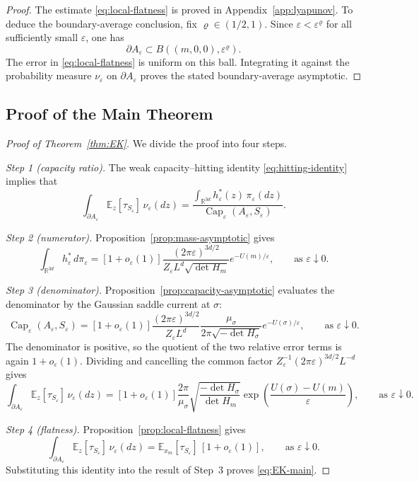 \documentclass[11pt]{article}
\numberwithin{equation}{section}
\theoremstyle{plain}
\theoremstyle{definition}
\theoremstyle{remark}
\newcommand{\R}{\mathbb R}
\newcommand{\eps}{\varepsilon}
\renewcommand{\Cap}{\operatorname{Cap}}
\newcommand{\E}{\mathbb E}
\begin{document}
\begin{proof}
The estimate \eqref{eq:local-flatness} is proved in
Appendix~\ref{app:lyapunov}.  To deduce the boundary-average conclusion, fix
$\varrho\in(1/2,1)$.  Since $\eps<\eps^\varrho$ for all sufficiently small
$\eps$, one has
\[
\partial A_\eps\subset B\left((m,0,0),\eps^\varrho\right).
\]
The error in \eqref{eq:local-flatness} is uniform on this ball.  Integrating
it against the probability measure $\nu_\eps$ on $\partial A_\eps$ proves the
stated boundary-average asymptotic.
\end{proof}

\subsection{Proof of the Main Theorem}
\label{sec:proof-main}

\begin{proof}[Proof of Theorem~\ref{thm:EK}]
We divide the proof into four steps.

\emph{Step 1 (capacity ratio).}  The weak capacity--hitting identity
\eqref{eq:hitting-identity} implies that
\[
\int_{\partial A_\eps} \E_z[\tau_{S_\eps}]\,\nu_\eps(dz)
=
\frac{\int_{\R^{3d}} h_\eps^*(z)\,\pi_\eps(dz)}{\Cap_\eps(A_\eps,S_\eps)}.
\]

\emph{Step 2 (numerator).}  Proposition~\ref{prop:mass-asymptotic} gives
\[
\int_{\R^{3d}}h_\eps^*\,d\pi_\eps
=\left[1+o_\eps(1)\right]
\frac{(2\pi\eps)^{3d/2}}{Z_\eps L^d\sqrt{\det H_m}}
e^{-U(m)/\eps},\qquad\text{as $\eps\downarrow 0$}.
\]

\emph{Step 3 (denominator).}  Proposition~\ref{prop:capacity-asymptotic}
evaluates the denominator by the Gaussian saddle current at $\sigma$:
\[
\Cap_\eps(A_\eps,S_\eps)
=\left[1+o_\eps(1)\right]
\frac{(2\pi\eps)^{3d/2}}{Z_\eps L^d}
\frac{\mu_\sigma}{2\pi\sqrt{-\det H_\sigma}}
e^{-U(\sigma)/\eps},\qquad\text{as $\eps\downarrow 0$}.
\]
The denominator is positive, so the quotient of the two relative error terms
is again $1+o_\eps(1)$.  Dividing and cancelling the common factor
$Z_\eps^{-1}(2\pi\eps)^{3d/2}L^{-d}$ gives
\[
\int_{\partial A_\eps} \E_z[\tau_{S_\eps}]\,\nu_\eps(dz)
=[1+o_\eps(1)]
\frac{2\pi}{\mu_\sigma}
\sqrt{\frac{-\det H_\sigma}{\det H_m}}
\exp\!\left(\frac{U(\sigma)-U(m)}{\eps}\right),\qquad\text{as $\eps\downarrow 0$}.
\]

\emph{Step 4 (flatness).}  Proposition~\ref{prop:local-flatness} gives
\[
\int_{\partial A_\eps}\E_z[\tau_{S_\eps}]\,\nu_\eps(dz)
=\E_{x_m}[\tau_{S_\eps}]\,[1+o_\eps(1)],\qquad\text{as $\eps\downarrow 0$}.
\]
Substituting this identity into the result of Step~3 proves
\eqref{eq:EK-main}.
\end{proof}
\end{document}
